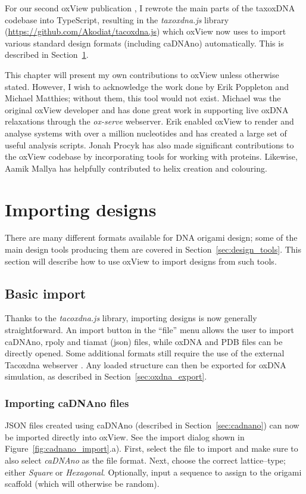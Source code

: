 For our second oxView publication \cite{bohlin2022oxview}, I rewrote the main parts of the taxoxDNA codebase into TypeScript, resulting in the \emph{taxoxdna.js} library (\url{https://github.com/Akodiat/tacoxdna.js}) which oxView now uses to import various standard design formats (including caDNAno) automatically. This is described in Section~\ref{sec:importing_designs}.

This chapter will present my own contributions to oxView \cite{poppleton2020design, bohlin2022oxview} unless otherwise stated. However, I wish to acknowledge the work done by Erik Poppleton and Michael Matthies; without them, this tool would not exist. Michael was the original oxView developer and has done great work in supporting live oxDNA relaxations through the \emph{ox-serve} webserver. Erik enabled oxView to render and analyse systems with over a million nucleotides and has created a large set of useful analysis scripts. Jonah Procyk has also made significant contributions to the oxView codebase by incorporating tools for working with proteins. Likewise, Aamik Mallya has helpfully contributed to helix creation and colouring.

\section{Importing designs}
\label{sec:importing_designs}
There are many different formats available for DNA origami design; some of the main design tools producing them are covered in Section~\ref{sec:design_tools}. This section will describe how to use oxView to import designs from such tools.

\subsection{Basic import}
Thanks to the \emph{tacoxdna.js} library, importing designs is now generally straightforward. An import button in the ``file'' menu allows the user to import caDNAno, rpoly and tiamat (json) files, while oxDNA and PDB files can be directly opened. Some additional formats still require the use of the external Tacoxdna webserver \cite{taco}. Any loaded structure can then be exported for oxDNA simulation, as described in Section~\ref{sec:oxdna_export}.

\subsubsection{Importing caDNAno files}
JSON files created using caDNAno (described in Section~\ref{sec:cadnano}) can now be imported directly into oxView. See the import dialog shown in Figure~\ref{fig:cadnano_import}.a). First, select the file to import and make sure to also select \emph{caDNAno} as the file format. Next, choose the correct lattice--type; either \emph{Square} or \emph{Hexagonal}. Optionally, input a sequence to assign to the origami scaffold (which will otherwise be random).

